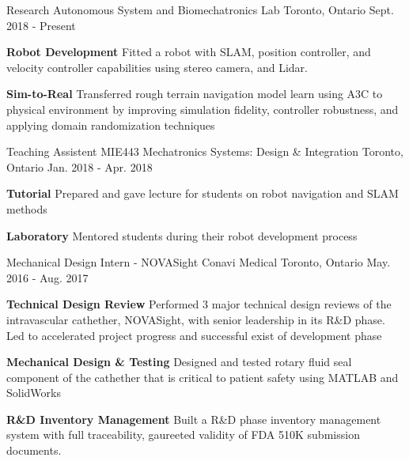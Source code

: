 \begin{cventries}
  \cventry
    {Research}
    {Autonomous System and Biomechatronics Lab}
    {Toronto, Ontario}
    {Sept. 2018 - Present}
    {
      \begin{cvitems}
        \item {
          \textbf{Robot Development} Fitted a robot with SLAM, position controller, and velocity controller capabilities using stereo camera, and Lidar. 
        }
        \item {
          \textbf{Sim-to-Real} Transferred rough terrain navigation model learn using A3C to physical environment by improving simulation fidelity, controller robustness, and applying domain randomization techniques
        }
      \end{cvitems}
    }
  \cventry
    {Teaching Assistent}
    {MIE443 Mechatronics Systems: Design \& Integration}
    {Toronto, Ontario}
    {Jan. 2018 - Apr. 2018}
    {
      \begin{cvitems}
        \item {
          \textbf{Tutorial} Prepared and gave lecture for students on robot navigation and SLAM methods
        }
        \item {
          \textbf{Laboratory} Mentored students during their robot development process
        }
      \end{cvitems}
    }
  \cventry
    {Mechanical Design Intern - NOVASight}
    {Conavi Medical}
    {Toronto, Ontario}
    {May. 2016 - Aug. 2017}
    {
      \begin{cvitems}
        \item {
          \textbf{Technical Design Review} Performed 3 major technical design reviews of the intravascular cathether, NOVASight, with senior leadership in its R\&D phase. Led to accelerated project progress and successful exist of development phase
        }
        \item {
            \textbf{Mechanical Design \& Testing} Designed and tested rotary fluid seal component of the cathether that is critical to patient safety using MATLAB and SolidWorks
        }
        \item {
            \textbf{R\&D Inventory Management} Built a R\&D phase inventory management system with full traceability, gaureeted validity of FDA 510K submission documents.
        }
      \end{cvitems}
    }  
\end{cventries}
